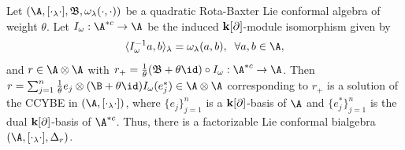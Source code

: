 \documentclass[12pt]{amsart}
\begin{document}
\begin{theorem}\label{rbflca}
Let
$(\A,[\cdot_\lambda\cdot],\mathfrak{B},\omega_\lambda(\cdot,\cdot))$
be a quadratic   Rota-Baxter Lie conformal
algebra of weight  $\theta$. Let
$I_\omega:\A^{*c}\rightarrow
\A$ be the induced ${\bf k}[\partial]$-module isomorphism given by
$$\langle I^{-1}_\omega a,b
\rangle_\lambda=\omega_\lambda(a,b),\;\; \forall a, b\in \A,$$ and
$r\in \A\otimes \A$ with $r_+=\frac{1}{\theta}(\mathfrak{B}+\theta
\id)\circ I_\omega:\A^{*c}\rightarrow \A$. Then  $r= \sum_{j=1}^n \frac{1}{\theta}e_j\otimes (\B+\theta \id )I_\omega(e_j^*)\in \A\otimes \A$  corresponding to $r_+$  is a solution
of the CCYBE in $(\A,[\cdot_\lambda\cdot])$, where $\{e_j\}_{j=1}^n$ is a ${\bf k}[\partial]$-basis of $\A$ and $\{e_j^*\}_{j=1}^n$ is the dual ${\bf k}[\partial]$-basis of $\A^{*c}$.
Thus, there is  a factorizable Lie conformal bialgebra
$(\A,[\cdot_\lambda\cdot],\Delta_r)$. %






\end{theorem}
\end{document}
